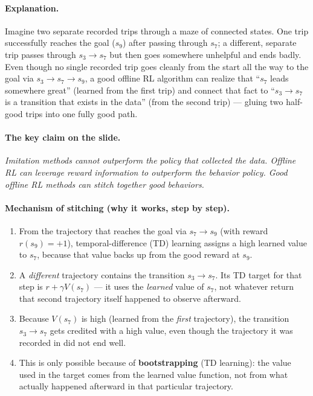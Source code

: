\documentclass[11pt]{article}
\begin{document}
\paragraph{Explanation.}
Imagine two separate recorded trips through a maze of connected states. One trip
successfully reaches the goal ($s_9$) after passing through $s_7$; a different, separate
trip passes through $s_3\to s_7$ but then goes somewhere unhelpful and ends badly. Even
though no single recorded trip goes cleanly from the start all the way to the goal via
$s_3\to s_7\to s_9$, a good offline RL algorithm can realize that ``$s_7$ leads somewhere
great'' (learned from the first trip) and connect that fact to ``$s_3\to s_7$ is a
transition that exists in the data'' (from the second trip) --- gluing two half-good
trips into one fully good path.

\paragraph{The key claim on the slide.}
\emph{Imitation methods cannot outperform the policy that collected the data. Offline
RL can leverage reward information to outperform the behavior policy. Good offline RL
methods can stitch together good behaviors.}

\paragraph{Mechanism of stitching (why it works, step by step).}
\begin{enumerate}
\item From the trajectory that reaches the goal via $s_7\to s_9$ (with reward $r(s_9)=+1$),
temporal-difference (TD) learning assigns a high learned value to $s_7$, because that
value backs up from the good reward at $s_9$.
\item A \emph{different} trajectory contains the transition $s_3\to s_7$. Its TD target
for that step is $r + \gamma V(s_7)$ --- it uses the \emph{learned} value of $s_7$, not
whatever return that second trajectory itself happened to observe afterward.
\item Because $V(s_7)$ is high (learned from the \emph{first} trajectory), the
transition $s_3\to s_7$ gets credited with a high value, even though the trajectory it
was recorded in did not end well.
\item This is only possible because of \textbf{bootstrapping} (TD learning): the value
used in the target comes from the learned value function, not from what actually
happened afterward in that particular trajectory.
\end{enumerate}
\end{document}
